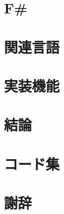 \documentclass[a4paper,11pt,openany]{ltjsbook}
\begin{document}
\chapter{F{\ttfamily\#}}\label{chap:Fsharp}


\chapter{関連言語}\label{chap:Related}


\chapter{実装機能}\label{chap:Features}


\chapter{結論}\label{chap:conclusion}


\appendix

\chapter{コード集}


\backmatter

\chapter*{謝辞}
 


\end{document}
